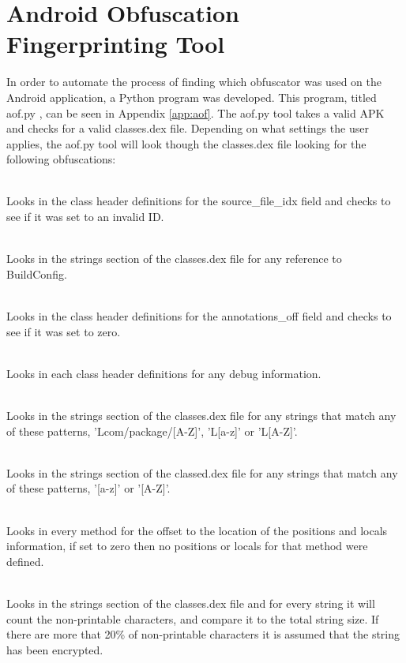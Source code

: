 \section{Android Obfuscation Fingerprinting Tool}
In order to automate the process of finding which obfuscator was used on the Android application, a Python program was developed. This program, titled aof.py \cite{aofgit}, can be seen in Appendix \ref{app:aof}. The aof.py tool takes a valid APK and checks for a valid classes.dex file. Depending on what settings the user applies, the aof.py tool will look though the classes.dex file looking for the following obfuscations:
\begin{description}[leftmargin=*,labelindent=1cm]
\item[Source File IDX Obfuscation] \hfill \\
Looks in the class header definitions for the source\_file\_idx field and checks to see if it was set to an invalid ID.
\item[Removal of the BuildConfig Class] \hfill \\
Looks in the strings section of the classes.dex file for any reference to BuildConfig.
\item[Removal of Annotations] \hfill \\
Looks in the class header definitions for the annotations\_off field and checks to see if it was set to zero.
\item[Removal of Debug Information] \hfill \\
Looks in each class header definitions for any debug information.
\item[Class Name Obfuscation] \hfill \\
Looks in the strings section of the classes.dex file for any strings that match any of these patterns, 'Lcom/package/[A-Z]', 'L[a-z]' or 'L[A-Z]'.
\item[Variable Name Obfuscation] \hfill \\
Looks in the strings section of the classed.dex file for any strings that match any of these patterns, '[a-z]' or '[A-Z]'.
\item[Removal of Positions and Locals] \hfill \\
Looks in every method for the offset to the location of the positions and locals information, if set to zero then no positions or locals for that method were defined.
\item[String Encryption] \hfill \\
Looks in the strings section of the classes.dex file and for every string it will count the non-printable characters, and compare it to the total string size. If there are more that 20\% of non-printable characters it is assumed that the string has been encrypted.
\end{description}
